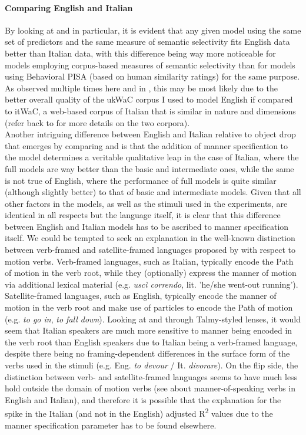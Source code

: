 \paragraph{Comparing English and Italian} By looking at  and  in particular, it is evident that any given model using the same set of predictors and the same measure of semantic selectivity fits English data better than Italian data, with this difference being way more noticeable for models employing corpus-based measures of semantic selectivity than for models using Behavioral PISA (based on human similarity ratings) for the same purpose. As observed multiple times here and in , this may be most likely due to the better overall quality of the ukWaC corpus I used to model English if compared to itWaC, a web-based corpus of Italian that is similar in nature and dimensions (refer back to  for more details on the two corpora).\\
Another intriguing difference between English and Italian relative to object drop that emerges by comparing  and  is that the addition of manner specification to the model determines a veritable qualitative leap in the case of Italian, where the full models are way better than the basic and intermediate ones, while the same is not true of English, where the performance of full models is quite similar (although slightly better) to that of basic and intermediate models. Given that all other factors in the models, as well as the stimuli used in the experiments, are identical in all respects but the language itself, it is clear that this difference between English and Italian models has to be ascribed to manner specification itself. We could be tempted to seek an explanation in the well-known distinction between verb-framed and satellite-framed languages proposed by \textcite{talmy1991path, talmy2000toward} with respect to motion verbs. Verb-framed languages, such as Italian, typically encode the Path of motion in the verb root, while they (optionally) express the manner of motion via additional lexical material (e.g. \textit{uscì correndo}, lit. 'he/she went-out running'). Satellite-framed languages, such as English, typically encode the manner of motion in the verb root and make use of particles to encode the Path of motion (e.g. \textit{to go in}, \textit{to fall down}). Looking at  and  through Talmy-styled lenses, it would seem that Italian speakers are much more sensitive to manner being encoded in the verb root than English speakers due to Italian being a verb-framed language, despite there being no framing-dependent differences in the surface form of the verbs used in the stimuli (e.g. Eng. \textit{to devour} / It. \textit{divorare}). On the flip side, the distinction between verb- and satellite-framed languages seems to have much less hold outside the domain of motion verbs (see \textcite{mastrofini2013english} about manner-of-speaking verbs in English and Italian), and therefore it is possible that the explanation for the spike in the Italian (and not in the English) adjusted R\textsuperscript{2} values due to the manner specification parameter has to be found elsewhere.


